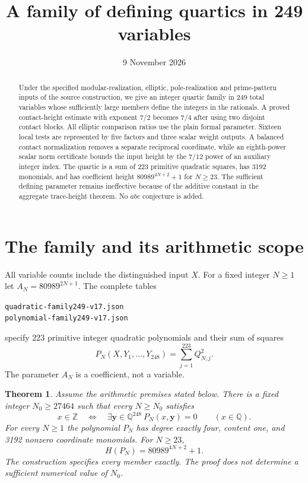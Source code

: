 \documentclass[11pt,a4paper]{article}
\title{A family of defining quartics in 249 variables}
\author{}\date{9 November 2026}
\newtheorem{theorem}{Theorem}[section]\newtheorem{lemma}[theorem]{Lemma}
\newcommand{\Q}{\mathbb Q}\newcommand{\Z}{\mathbb Z}\newcommand{\HH}{\mathcal H}
\begin{document}
\maketitle
\begin{abstract}
Under the specified modular-realization, elliptic, pole-realization and
prime-pattern inputs of the source construction, we give an integer
quartic family in 249 total variables whose sufficiently large members
define the integers in the rationals. A proved contact-height estimate
with exponent $7/2$ becomes $7/4$ after using two disjoint contact blocks.
All elliptic comparison ratios use the plain formal parameter. Sixteen
local tests are represented by five factors and three scalar weight
outputs. A balanced contact normalization removes a separate reciprocal
coordinate, while an eighth-power scalar norm certificate bounds the
input height by the $7/12$ power of an auxiliary integer index.
The quartic is a sum of 223 primitive quadratic squares, has 3192
monomials, and has coefficient height $80989^{4N+2}+1$ for $N\ge23$.
The sufficient defining parameter remains ineffective because of the
additive constant in the aggregate trace-height theorem. No $abc$
conjecture is added.
\end{abstract}

\section{The family and its arithmetic scope}
All variable counts include the distinguished input $X$. For a fixed
integer $N\ge1$ let $A_N=80989^{2N+1}$. The complete tables
\begin{center}\small
\nolinkurl{quadratic-family249-v17.json}\\
\nolinkurl{polynomial-family249-v17.json}
\end{center}
specify 223 primitive integer
quadratic polynomials and their sum of squares
\[
 P_N(X,Y_1,\ldots,Y_{248})=\sum_{j=1}^{223}Q_{N,j}^2.
\]
The parameter $A_N$ is a coefficient, not a variable.

\begin{theorem}\label{thm:main}
Assume the arithmetic premises stated below. There is a fixed integer
$N_0\ge27464$ such that every $N\ge N_0$ satisfies
\[
 x\in\Z\quad\Longleftrightarrow\quad
 \exists\mathbf y\in\Q^{248}\ P_N(x,\mathbf y)=0
 \qquad(x\in\Q).
\]
For every $N\ge1$ the polynomial $P_N$ has degree exactly four,
content one, and 3192 nonzero coordinate monomials. For $N\ge23$,
\[
                       H(P_N)=80989^{4N+2}+1.
\]
The construction specifies every member exactly. The proof does not
determine a sufficient numerical value of $N_0$.
\end{theorem}
\end{document}
